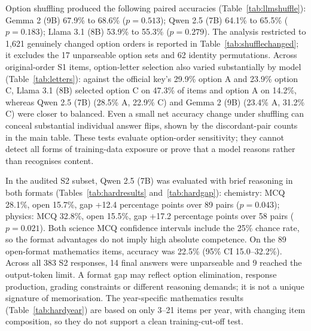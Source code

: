 Option shuffling produced the following paired accuracies (Table~\ref{tab:llmshuffle}): Gemma 2 (9B) 67.9\% to 68.6\% ($p=0.513$); Qwen 2.5 (7B) 64.1\% to 65.5\% ($p=0.183$); Llama 3.1 (8B) 53.9\% to 55.3\% ($p=0.279$). The analysis restricted to 1,621 genuinely changed option orders is reported in Table~\ref{tab:shufflechanged}; it excludes the 17 unparseable option sets and 62 identity permutations. Across original-order S1 items, option-letter selection also varied substantially by model (Table~\ref{tab:letters}): against the official key's 29.9\% option A and 23.9\% option C, Llama 3.1 (8B) selected option C on 47.3\% of items and option A on 14.2\%, whereas Qwen 2.5 (7B) (28.5\% A, 22.9\% C) and Gemma 2 (9B) (23.4\% A, 31.2\% C) were closer to balanced. Even a small net accuracy change under shuffling can conceal substantial individual answer flips, shown by the discordant-pair counts in the main table. These tests evaluate option-order sensitivity; they cannot detect all forms of training-data exposure or prove that a model reasons rather than recognises content.

In the audited S2 subset, Qwen 2.5 (7B) was evaluated with brief reasoning in both formats (Tables~\ref{tab:hardresults} and~\ref{tab:hardgap}): chemistry: MCQ 28.1\%, open 15.7\%, gap +12.4 percentage points over 89 pairs ($p=0.043$); physics: MCQ 32.8\%, open 15.5\%, gap +17.2 percentage points over 58 pairs ($p=0.021$). Both science MCQ confidence intervals include the 25\% chance rate, so the format advantages do not imply high absolute competence. On the 89 open-format mathematics items, accuracy was 22.5\% (95\% CI 15.0--32.2\%). Across all 383 S2 responses, 14 final answers were unparseable and 9 reached the output-token limit. A format gap may reflect option elimination, response production, grading constraints or different reasoning demands; it is not a unique signature of memorisation. The year-specific mathematics results (Table~\ref{tab:hardyear}) are based on only 3--21 items per year, with changing item composition, so they do not support a clean training-cut-off test.
